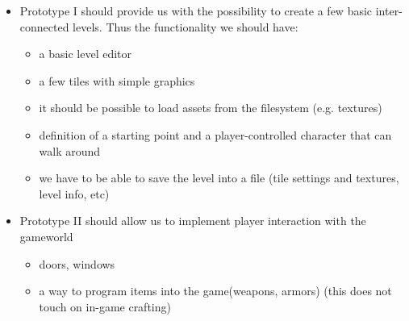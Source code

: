 \documentclass[a4paper,10pt]{book}
\begin{document}
\begin{itemize}
  \item \Enginename{} Prototype I should provide us with the possibility to create a few basic inter-connected levels. Thus the functionality we should have:
  \begin{itemize}
    \item a basic level editor
    \item a few tiles with simple graphics
    \item it should be possible to load assets from the filesystem (e.g. textures)
    \item definition of a starting point and a player-controlled character that can walk around
    \item we have to be able to save the level into a file (tile settings and textures, level info, etc)
  \end{itemize}
  \item \Enginename{} Prototype II should allow us to implement player interaction with the gameworld
  \begin{itemize}
    \item doors, windows
    \item a way to program items into the game(weapons, armors) (this does not touch on in-game crafting)
  \end{itemize}
\end{itemize}
\end{document}
